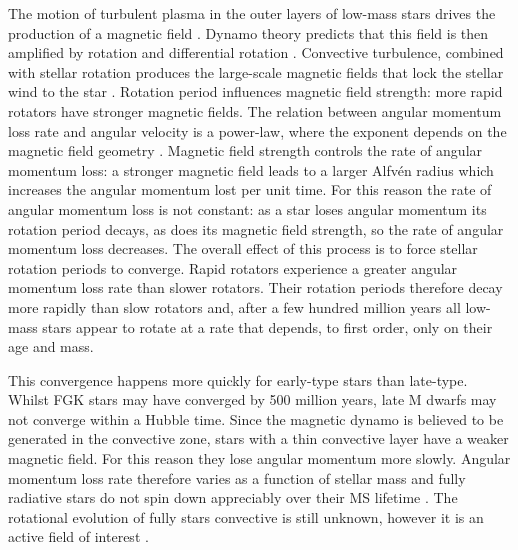 The motion of turbulent plasma in the outer layers of low-mass stars drives
the production of a magnetic field \citep[][]{Schatzman1962}.
Dynamo theory predicts that this field is then amplified by rotation and
differential rotation \citep[\eg][]{Parker1970}.
Convective turbulence, combined with stellar rotation produces the large-scale
magnetic fields that lock the stellar wind to the star
\citep[\eg][]{Charbonneau2010}.
Rotation period influences magnetic field strength: more rapid rotators have
stronger magnetic fields.
The relation between angular momentum loss rate and angular velocity is a
power-law, where the exponent depends on the magnetic field geometry
\citet{Mestel1984, Kawaler1988}.
Magnetic field strength controls the rate of angular momentum loss: a stronger
magnetic field leads to a larger Alfv{\'e}n radius which increases the angular
momentum lost per unit time.
For this reason the rate of angular momentum loss is not constant: as a star
loses angular momentum its rotation period decays, as does its magnetic field
strength, so the rate of angular momentum loss decreases.
The overall effect of this process is to force stellar rotation periods to
converge.
Rapid rotators experience a greater angular momentum loss rate than slower
rotators.
Their rotation periods therefore decay more rapidly than slow rotators and,
after a few hundred million years all low-mass stars appear to rotate at a
rate that depends, to first order, only on their age and mass.

This convergence happens more quickly for early-type stars than late-type.
Whilst FGK stars may have converged by 500 million years, \citep{Radick1987,
Irwin2009} late M dwarfs may not converge within a Hubble time.
Since the magnetic dynamo is believed to be generated in the convective zone,
stars with a thin convective layer have a weaker magnetic field.
For this reason they lose angular momentum more slowly.
Angular momentum loss rate therefore varies as a function of stellar mass and
fully radiative stars do not spin down appreciably over their MS lifetime
\citep{Noyes1984_2}.
The rotational evolution of fully stars convective is still unknown, however
it is an active field of interest \citep[\eg][]{Mcquillan2013, Newton2015}.

